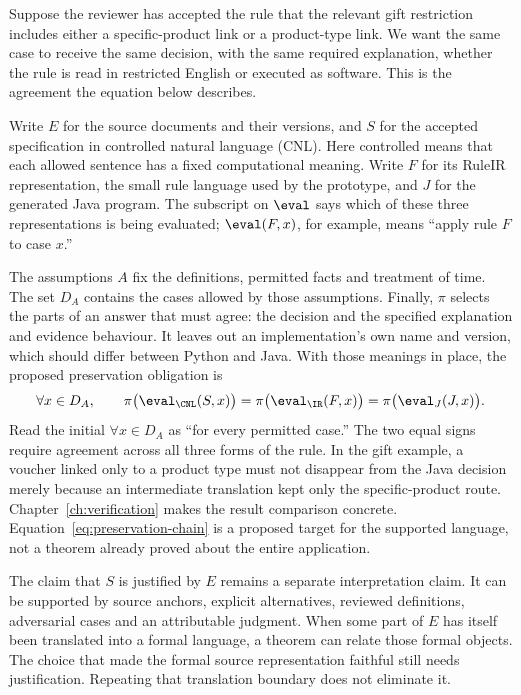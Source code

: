 
Suppose the reviewer has accepted the rule that the relevant gift restriction
includes either a specific-product link or a product-type link. We want the same
case to receive the same decision, with the same required explanation, whether
the rule is read in restricted English or executed as software. This is the
agreement the equation below describes.

Write $E$ for the source documents and their versions, and $S$ for the accepted
specification in controlled natural language (CNL). Here controlled means that
each allowed sentence has a fixed computational meaning. Write $F$ for its
RuleIR representation, the small rule language used by the prototype, and $J$
for the generated Java program. The subscript on $\eval$ says which of these
three representations is being evaluated; $\eval(F,x)$, for example, means
``apply rule $F$ to case $x$.''

The assumptions $A$ fix the definitions, permitted facts and treatment of time.
The set $D_A$ contains the cases allowed by those assumptions. Finally, $\pi$
selects the parts of an answer that must agree: the decision and the specified
explanation and evidence behaviour. It leaves out an implementation's own name
and version, which should differ between Python and Java. With those meanings in
place, the proposed preservation obligation is
\begin{equation}
 \forall x\in D_A,\qquad
 \pi\bigl(\eval_{\CNL}(S,x)\bigr)
 =\pi\bigl(\eval_{\IR}(F,x)\bigr)
 =\pi\bigl(\eval_{J}(J,x)\bigr).
 \label{eq:preservation-chain}
\end{equation}
Read the initial $\forall x\in D_A$ as ``for every permitted case.'' The two
equal signs require agreement across all three forms of the rule. In the gift
example, a voucher linked only to a product type must not disappear from the
Java decision merely because an intermediate translation kept only the
specific-product route. Chapter~\ref{ch:verification} makes the result comparison
concrete. Equation~\eqref{eq:preservation-chain} is a proposed target for the
supported language, not a theorem already proved about the entire application.

The claim that $S$ is justified by $E$ remains a separate interpretation claim.
It can be supported by source anchors, explicit alternatives, reviewed
definitions, adversarial cases and an attributable judgment. When some part of
$E$ has itself been translated into a formal language, a theorem can relate
those formal objects. The choice that made the formal source representation
faithful still needs justification. Repeating that translation boundary does not
eliminate it.

